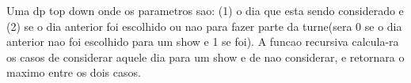 Uma dp top down onde os parametros sao: (1) o dia que esta sendo considerado e (2) se o dia anterior foi escolhido ou nao para fazer parte da turne(sera 0 se o dia anterior nao foi escolhido para um show e 1 se foi). A funcao recursiva calcula-ra os casos de considerar aquele dia para um show e de nao considerar, e retornara o maximo entre os dois casos. 
